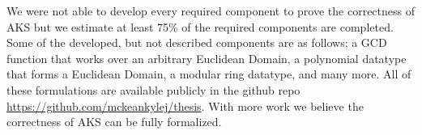 \documentclass[./Thesis.tex]{subfiles}
\begin{document}
We were not able to develop every required component to prove the
correctness of AKS but we estimate at least 75\% of the required components are
completed. Some of the developed, but not described components are as follows; a
GCD function that works over an arbitrary Euclidean Domain, a polynomial
datatype that forms a Euclidean Domain, a modular ring datatype, and many more.
All of these formulations are available publicly in the github repo
\url{https://github.com/mckeankylej/thesis}. With more work we believe the
correctness of AKS can be fully formalized.
\end{document}
